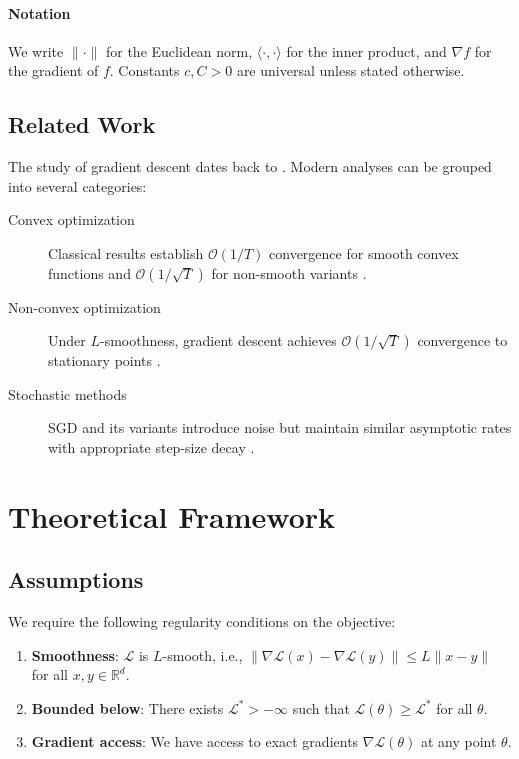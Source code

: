 \documentclass[11pt]{article}
\begin{document}
\paragraph{Notation} We write $\|\cdot\|$ for the Euclidean norm,
$\langle \cdot, \cdot \rangle$ for the inner product, and $\nabla f$ for
the gradient of $f$. Constants $c, C > 0$ are universal unless stated
otherwise.

\subsection{Related Work}\label{sec:related}

The study of gradient descent dates back to \citet{cauchy1847}. Modern
analyses can be grouped into several categories:

\begin{description}
\item[Convex optimization] Classical results establish $\mathcal{O}(1/T)$
  convergence for smooth convex functions and $\mathcal{O}(1/\sqrt{T})$ for
  non-smooth variants \cite{nesterov2004}.
\item[Non-convex optimization] Under $L$-smoothness, gradient descent
  achieves $\mathcal{O}(1/\sqrt{T})$ convergence to stationary points
  \cite{nesterov2004}.
\item[Stochastic methods] SGD and its variants introduce noise but maintain
  similar asymptotic rates with appropriate step-size decay
  \cite{robbins1951}.
\end{description}

\section{Theoretical Framework}\label{sec:theory}

\subsection{Assumptions}

We require the following regularity conditions on the objective:

\begin{enumerate}
\item \textbf{Smoothness}: $\mathcal{L}$ is $L$-smooth, i.e.,
  $\|\nabla \mathcal{L}(x) - \nabla \mathcal{L}(y)\| \leq L\|x - y\|$
  for all $x, y \in \mathbb{R}^d$.
\item \textbf{Bounded below}: There exists $\mathcal{L}^* > -\infty$ such
  that $\mathcal{L}(\theta) \geq \mathcal{L}^*$ for all $\theta$.
\item \textbf{Gradient access}: We have access to exact gradients
  $\nabla \mathcal{L}(\theta)$ at any point $\theta$.
\end{enumerate}
\end{document}
